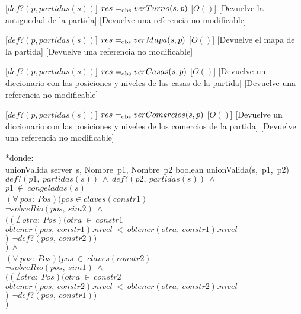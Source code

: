 \begin{Interfaz}
    [$def?(p, partidas(s))$]
    {$res =_{\mathrm{obs}} verTurno(s, p)$}
    [$O()$]
    [Devuelve la antiguedad de la partida]
    [Devuelve una referencia no modificable]

    [$def?(p, partidas(s))$]
    {$res =_{\mathrm{obs}} verMapa(s, p)$}
    [$O()$]
    [Devuelve el mapa de la partida]
    [Devuelve una referencia no modificable]

    [$def?(p, partidas(s))$]
    {$res =_{\mathrm{obs}} verCasas(s, p)$}
    [$O()$]
    [Devuelve un diccionario con las posiciones y niveles de las casas de la partida]
    [Devuelve una referencia no modificable]

    [$def?(p, partidas(s))$]
    {$res =_{\mathrm{obs}} verComercios(s, p)$}
    [$O()$]
    [Devuelve un diccionario con las posiciones y niveles de los comercios de la partida]
    [Devuelve una referencia no modificable]

    \pagebreak

    *donde: \\
\tadOperacion
    {unionValida}
    {server\ s, Nombre\ p1, Nombre\ p2}
    {boolean}
    {}
\tadAxioma
    {unionValida(s,\ p1,\ p2)}     
    {$
        def?(p1,\ partidas(s))\ \land\ 
        def?(p2,\ partidas(s))\ \land\ $\\$
        p1\ \notin\ congeladas(s)\ $\yluego$\ $\\$
        (\forall\ pos:\ Pos)(pos \in claves(constr1)\ $\impluego\ \\$   
            $\tab$ \neg sobreRio(pos,\ sim2)\ \land\  $\\$
            $\tab$ ((\nexists\ otra:\ Pos)(otra\ \in\ constr1\ $\yluego\ \\$ 
            $\tab\tab$ obtener(pos,\ constr1).nivel\ <\ obtener(otra,\ constr1).nivel $\\$
            $\tab$)\ $\impluego$\ \neg def?(pos,\ constr2))\ $\\$
        )\ \land\ $\\$
        (\forall\ pos:\ Pos)(pos\ \in\ claves(constr2)\ $\impluego\ \\$   
            $\tab$ \neg sobreRio(pos,\ sim1)\ \land\  $\\$
            $\tab$((\nexists otra:\ Pos)(otra\ \in\ constr2\ $\yluego$\ $\\$ 
            $\tab\tab$ obtener(pos,\ constr2).nivel\ <\  obtener(otra,\ constr2).nivel $\\$
            $\tab$)\ $\impluego$\ \neg def?(pos,\ constr1))\ $\\$
        )               
        $}
    

\end{Interfaz}
